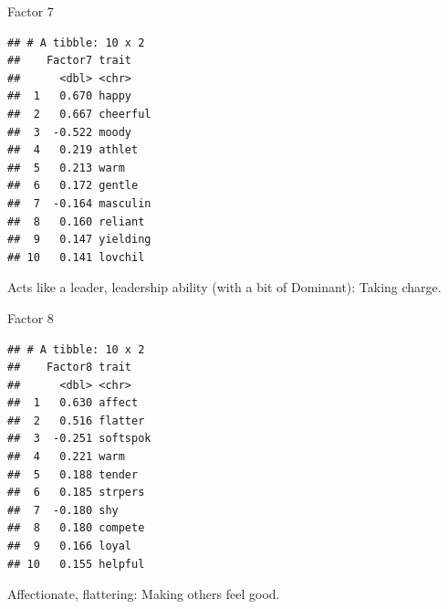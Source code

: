 \documentclass[
  ignorenonframetext,
]{beamer}
\newenvironment{Shaded}{\begin{snugshade}}{\end{snugshade}}
\newcommand{\DecValTok}[1]{\textcolor[rgb]{0.00,0.00,0.81}{#1}}
\newcommand{\KeywordTok}[1]{\textcolor[rgb]{0.13,0.29,0.53}{\textbf{#1}}}
\newcommand{\NormalTok}[1]{#1}
\newcommand{\OperatorTok}[1]{\textcolor[rgb]{0.81,0.36,0.00}{\textbf{#1}}}
\newcommand{\StringTok}[1]{\textcolor[rgb]{0.31,0.60,0.02}{#1}}
\begin{document}
\begin{frame}[fragile]{Factor 7}
\protect\hypertarget{factor-7}{}

\footnotesize

\begin{Shaded}
\end{Shaded}

\begin{verbatim}
## # A tibble: 10 x 2
##    Factor7 trait   
##      <dbl> <chr>   
##  1   0.670 happy   
##  2   0.667 cheerful
##  3  -0.522 moody   
##  4   0.219 athlet  
##  5   0.213 warm    
##  6   0.172 gentle  
##  7  -0.164 masculin
##  8   0.160 reliant 
##  9   0.147 yielding
## 10   0.141 lovchil
\end{verbatim}

\normalsize

Acts like a leader, leadership ability (with a bit of Dominant): Taking
charge.

\end{frame}

\begin{frame}[fragile]{Factor 8}
\protect\hypertarget{factor-8}{}

\footnotesize

\begin{Shaded}
\end{Shaded}

\begin{verbatim}
## # A tibble: 10 x 2
##    Factor8 trait   
##      <dbl> <chr>   
##  1   0.630 affect  
##  2   0.516 flatter 
##  3  -0.251 softspok
##  4   0.221 warm    
##  5   0.188 tender  
##  6   0.185 strpers 
##  7  -0.180 shy     
##  8   0.180 compete 
##  9   0.166 loyal   
## 10   0.155 helpful
\end{verbatim}

\normalsize

Affectionate, flattering: Making others feel good.

\end{frame}
\end{document}
